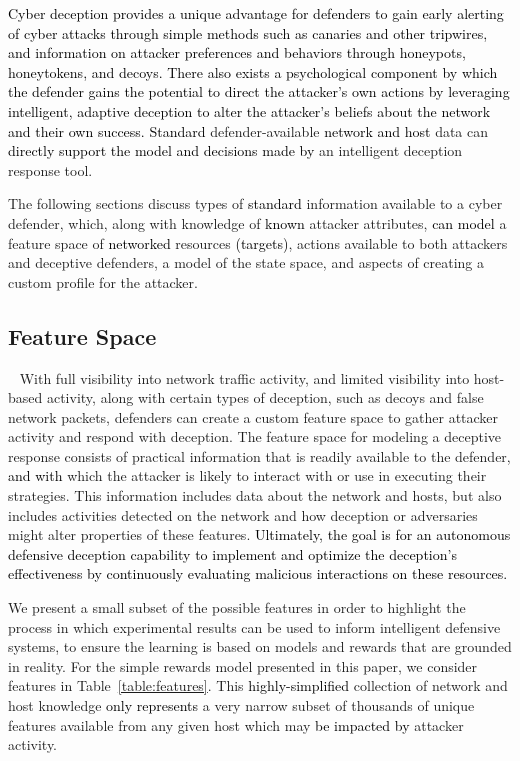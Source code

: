 \documentclass{article}
\newcommand\mmm[1]{\textcolor{black}{#1}}
\newcommand\kjf[1]{\textcolor{black}{#1}}
\newcommand\nnn[1]{\textcolor{black}{#1}}
\begin{document}
\mmm{Cyber deception provides a unique advantage for defenders to gain early alerting of cyber attacks through simple methods such as canaries and other tripwires, \kjf{and information on attacker preferences and behaviors through honeypots, honeytokens, and decoys}. There also exists a psychological component by which the defender gains the potential to direct the attacker's own actions 
by leveraging intelligent, adaptive deception to alter the attacker's beliefs about the network and their own success.}
\mmm{Standard} defender-available \mmm{network and host} data can \mmm{directly support the model and decisions made by} an intelligent deception response tool.

The following sections discuss types of \mmm{standard} information available to a cyber defender, which, along with knowledge of \mmm{known} attacker attributes, \mmm{can model} a feature space of \mmm{networked} resources \mmm{(targets)}, actions available to both attackers and deceptive defenders, a model of the state space, and aspects of creating a custom profile for the attacker.
 

\subsection{Feature Space}~\label{sub:feature}
With full visibility into network traffic activity, and limited visibility into host-based activity, along with certain types of deception, such as decoys and false network packets, defenders can create a custom feature space to gather attacker activity and respond with deception. The feature space for modeling a deceptive response consists of practical information that is readily available to the defender, \nnn{and with} which the attacker is likely to interact with or use in executing their strategies. This information includes data about the network and hosts, but also includes activities detected on the network and how deception or adversaries might alter properties of these features. \mmm{Ultimately, the goal is for an autonomous defensive deception capability to implement and optimize the deception's effectiveness by continuously evaluating malicious interactions on these resources.}

We present a small subset of the possible features in order to highlight the process in which experimental results can be used to inform intelligent defensive systems, to ensure the learning is based on models and rewards that are grounded in reality. For the simple rewards model presented in this paper, we consider features in Table~\ref{table:features}. This \mmm{highly-simplified} collection of network and host knowledge \mmm{only represents} a very narrow subset of thousands of unique features available from any given host which may \mmm{be impacted by} attacker activity. 
\end{document}
